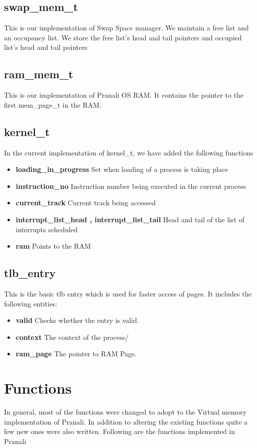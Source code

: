 \documentclass[paper=a4, fontsize=11pt,twoside]{scrartcl}   %
\begin{document}
\subsection{swap\_mem\_t}
This is our implementation of Swap Space manager. We maintain a free list and an occupancy list. We store the free list's head and tail pointers and occupied list's head and tail pointers

\subsection{ram\_mem\_t}
This is our implementation of Pranali OS RAM. It contains the pointer to the first mem\_page\_t in the RAM.

\subsection{kernel\_t}
In the current implementation of kernel\_t, we have added the following functions
\begin{itemize}
\item \textbf {loading\_in\_progress} Set when loading of a process is taking place
\item \textbf{instruction\_no} Instruction number being executed in the current process
\item \textbf{current\_track} Current track being accessed
\item \textbf{interrupt\_list\_head , interrupt\_list\_tail} Head and tail of the list of interrupts scheduled
\item \textbf{ram} Points to the RAM
\end{itemize}

\subsection{tlb\_entry}
This is the basic tlb entry which is used for faster access of pages. It includes the following entities:
\begin{itemize}
    \item \textbf{valid} Checks whether the entry is valid.
    \item \textbf{context} The context of the process/
    \item \textbf{ram\_page} The pointer to RAM Page.
    \end{itemize}


\section{Functions}
In general, most of the functions were changed to adopt to the Virtual memory
implementation of Pranali. In addition to altering the existing functions quite a few new ones were also written. Following are the functions implemented in Pranali
\end{document}
